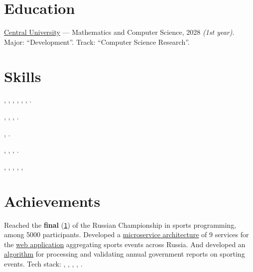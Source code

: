 \documentclass[margin,line]{resume}
\begin{document}
\begin{resume}
  \section{\mysidestyle Education}
  \href{https://centraluniversity.ru/}{Central University} —
  Mathematics and Computer Science, 2028 \textit{(1st year)}.
  Major: “Development”. Track: “Computer Science Research”.

  \section{\mysidestyle Skills}

  \vspace{0.4mm}
  \begin{description}[leftmargin=0pt, itemindent=*, itemsep=0.2pt]
    \item[Python:] \hangindent=9mm 
      , ,
      ,
      , ,
      , .
    \item[Databases:] , ,
      , .
    \item[Message brokers:] , .
    \item[Other technologies:] , ,
      , .
    \item[Dev tools:] , ,
      , , ,
  \end{description}

  \section{\mysidestyle Achievements}
  Reached the \textbf{final}
  (\href{https://alchemmist.github.io/CV/attachments/russian-chemp-final.pdf}{\texttt{1}})
  of the Russian Championship
  in sports programming, among 5000 participants. Developed a
  \href{https://alchemmist.github.io/CV/attachments/architect.pdf}{microservice architecture}
  of 9 services for the
  \href{https://github.com/alchemmist/sportprog}{web application}
  aggregating sports events across Russia. And developed an
  \href{https://github.com/alchemmist/sport-afisha/blob/main/event_parsing_service/parse_pdf.py}{algorithm}
  for processing and validating annual government reports on sporting events.
  Tech stack: , ,
  ,
  ,
  .


\end{resume}
\end{document}
